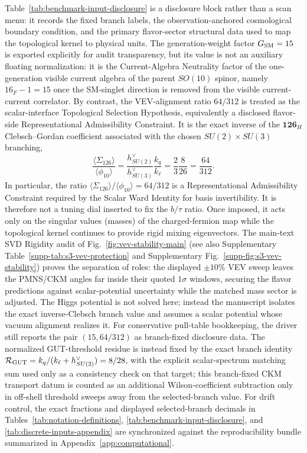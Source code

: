\documentclass[11pt]{article}
\begin{document}
Table~\ref{tab:benchmark-input-disclosure} is a disclosure block rather than a scan menu: it records the fixed branch labels, the observation-anchored cosmological boundary condition, and the primary flavor-sector structural data used to map the topological kernel to physical units. The generation-weight factor $G_{\rm SM}=15$ is exported explicitly for audit transparency, but its value is not an auxiliary floating normalization: it is the Current-Algebra Neutrality factor of the one-generation visible current algebra of the parent $SO(10)$ spinor, namely $16_F-1=15$ once the SM-singlet direction is removed from the visible current-current correlator. By contrast, the VEV-alignment ratio $64/312$ is treated as the scalar-interface Topological Selection Hypothesis, equivalently a disclosed flavor-side Representational Admissibility Constraint. It is the exact inverse of the $\mathbf{126}_H$ Clebsch--Gordan coefficient associated with the chosen $SU(2)\times SU(3)$ branching,
\begin{equation}
 \frac{\langle\Sigma_{126}\rangle}{\langle\phi_{10}\rangle}
 =
 \frac{h^{\vee}_{SU(2)}}{h^{\vee}_{SU(3)}}\frac{k_q}{k_{\ell}}
 =
 \frac{2}{3}\frac{8}{26}
 =
 \frac{64}{312}.
\end{equation}
In particular, the ratio $\langle\Sigma_{126}\rangle/\langle\phi_{10}\rangle=64/312$ is a Representational Admissibility Constraint required by the Scalar Ward Identity for basis invertibility. It is therefore not a tuning dial inserted to fix the $b/\tau$ ratio. Once imposed, it acts only on the singular values (masses) of the charged-fermion map while the topological kernel continues to provide rigid mixing eigenvectors. The main-text SVD Rigidity audit of Fig.~\ref{fig:vev-stability-main} (see also Supplementary Table~\ref{supp-tab:s3-vev-protection} and Supplementary Fig.~\ref{supp-fig:s3-vev-stability}) proves the separation of roles: the displayed $\pm10\%$ VEV sweep leaves the PMNS/CKM angles far inside their quoted $1\sigma$ windows, securing the flavor predictions against scalar-potential uncertainty while the matched mass sector is adjusted. The Higgs potential is not solved here; instead the manuscript isolates the exact inverse-Clebsch branch value and assumes a scalar potential whose vacuum alignment realizes it. For conservative pull-table bookkeeping, the driver still reports the pair $(15,64/312)$ as branch-fixed disclosure data. The normalized GUT-threshold residue is instead fixed by the exact branch identity $\mathcal R_{\rm GUT}=k_q/(k_{\ell}+h^{\vee}_{SU(2)})=8/28$, with the explicit scalar-spectrum matching sum used only as a consistency check on that target; this branch-fixed CKM transport datum is counted as an additional Wilson-coefficient subtraction only in off-shell threshold sweeps away from the selected-branch value. %
For drift control, the exact fractions and displayed selected-branch decimals in Tables~\ref{tab:notation-definitions}, \ref{tab:benchmark-input-disclosure}, and \ref{tab:discrete-inputs-appendix} are synchronized against the reproducibility bundle summarized in Appendix~\ref{app:computational}.
\end{document}
